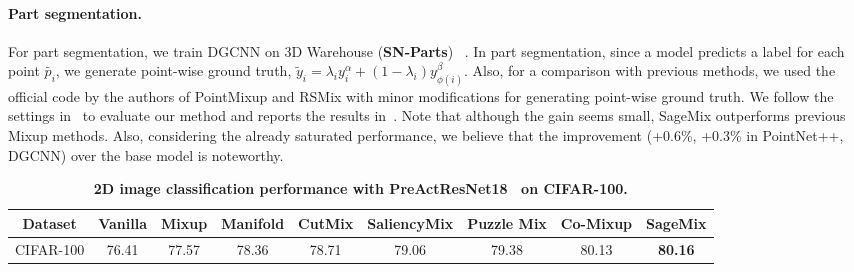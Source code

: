 \documentclass{article}
\begin{document}
 \paragraph{Part segmentation.} For part segmentation, we train DGCNN on 3D Warehouse (\textbf{SN-Parts}) ~\cite{3dwarehouse,xu2021image2point}. In part segmentation, since a model predicts a label for each point $\tilde{p_i}$, we generate point-wise ground truth, \ie $\tilde{y}_i = \lambda_i y^\alpha_i +(1-\lambda_i) y^\beta_{\phi(i)}$. Also, for a comparison with previous methods, we used the official code by the authors of PointMixup and RSMix with minor modifications for generating point-wise ground truth.
We follow the settings in~\cite{qi2017pointnet++, wang2019dynamic} to evaluate our method and reports the results in~. Note that although the gain seems small, SageMix outperforms previous Mixup methods. Also, considering the already saturated performance, we believe that the improvement (+0.6\%, +0.3\% in PointNet++, DGCNN) over the base model is noteworthy. 

\begin{table}[t!]
  \centering 
  \setlength{\tabcolsep}{2pt}
  \renewcommand{\arraystretch}{1.1}
  \caption{\textbf{2D image classification performance with PreActResNet18~\cite{he2016identity} on CIFAR-100.}}
  \label{table:2dclassification} 
  \begin{tabular}{l|ccccccc|c}
  \toprule
  \multicolumn{1}{c|}{\textbf{Dataset}}&\multicolumn{1}{c}{Vanilla}& \multicolumn{1}{c}{Mixup} &\multicolumn{1}{c}{Manifold} &
  \multicolumn{1}{c}{CutMix} &
  \multicolumn{1}{c}{SaliencyMix}&
  \multicolumn{1}{c}{Puzzle Mix} & \multicolumn{1}{c|}{Co-Mixup} &  \multicolumn{1}{c}{\textbf{SageMix}} \\
  \midrule
  \midrule
  CIFAR-100 & 76.41 & 77.57 & 78.36 & 78.71 & 79.06 & 79.38 & 80.13 & \textbf{80.16}\\
  \bottomrule
  \end{tabular}
  
\end{table} 
\end{document}
